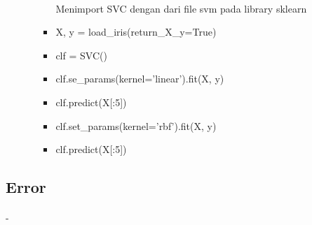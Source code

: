 \documentclass{article}
\begin{document}
\begin{enumerate}
\begin{itemize}
\begin{itemize}
                                \paragraph{}Menimport SVC dengan dari file svm pada library sklearn
                            \item X, y = load\_iris(return\_X\_y=True)
                            \item clf = SVC()
                            \item clf.se\_params(kernel='linear').fit(X, y)
                            \item clf.predict(X[:5])
                            \item clf.set\_params(kernel='rbf').fit(X, y)
                            \item clf.predict(X[:5])
                        \end{itemize}
                \end{itemize}
        \end{enumerate}
    \subsection{Error}
        \paragraph{}-
\end{document}

